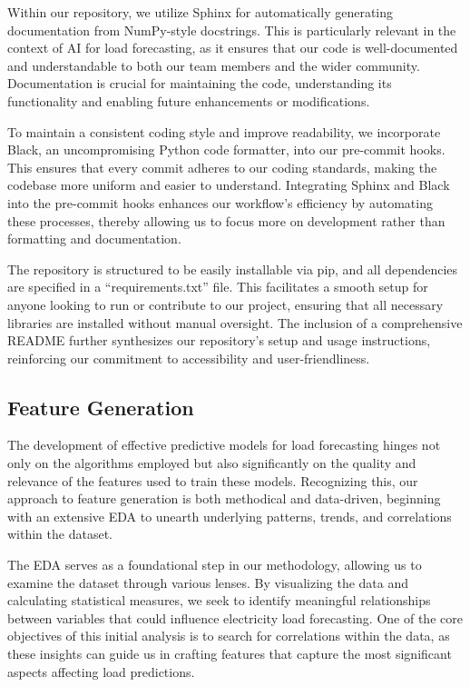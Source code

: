 \documentclass{article} %
\begin{document}
Within our repository, we utilize Sphinx for automatically generating documentation from NumPy-style docstrings. This is particularly relevant in the context of AI for load forecasting, as it ensures that our code is well-documented and understandable to both our team members and the wider community. Documentation is crucial for maintaining the code, understanding its functionality and enabling future enhancements or modifications. 

To maintain a consistent coding style and improve readability, we incorporate Black, an uncompromising Python code formatter, into our pre-commit hooks. This ensures that every commit adheres to our coding standards, making the codebase more uniform and easier to understand. Integrating Sphinx and Black into the pre-commit hooks enhances our workflow's efficiency by automating these processes, thereby allowing us to focus more on development rather than formatting and documentation. 

The repository is structured to be easily installable via pip, and all dependencies are specified in a “requirements.txt” file. This facilitates a smooth setup for anyone looking to run or contribute to our project, ensuring that all necessary libraries are installed without manual oversight. The inclusion of a comprehensive README further synthesizes our repository's setup and usage instructions, reinforcing our commitment to accessibility and user-friendliness. 



\subsection{Feature Generation}
\label{subCha.:FeatureGeneration}
The development of effective predictive models for load forecasting hinges not only on the algorithms employed but also significantly on the quality and relevance of the features used to train these models. Recognizing this, our approach to feature generation is both methodical and data-driven, beginning with an extensive \gls*{EDA} to unearth underlying patterns, trends, and correlations within the dataset. 

The \gls*{EDA} serves as a foundational step in our methodology, allowing us to examine the dataset through various lenses. By visualizing the data and calculating statistical measures, we seek to identify meaningful relationships between variables that could influence electricity load forecasting. One of the core objectives of this initial analysis is to search for correlations within the data, as these insights can guide us in crafting features that capture the most significant aspects affecting load predictions. 
\end{document}
